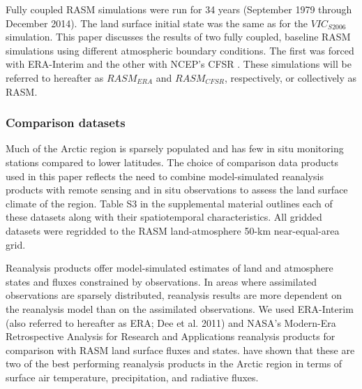 Fully coupled RASM simulations were run for 34 years (September 1979 through December 2014).
The land surface initial state was the same as for the $VIC_{S2006}$ simulation.
This paper discusses the results of two fully coupled, baseline RASM simulations using different atmospheric boundary conditions.
The first was forced with ERA-Interim \citep{Dee_2011} and the other with NCEP’s CFSR \citep{Saha_2011}.
These simulations will be referred to hereafter as $RASM_{ERA}$ and $RASM_{CFSR}$, respectively, or collectively as RASM.

\subsubsection{Comparison datasets}
\label{sec:datasets}

Much of the Arctic region is sparsely populated and has few in situ monitoring stations compared to lower latitudes.
The choice of comparison data products used in this paper reflects the need to combine model-simulated reanalysis products with remote sensing and in situ observations to assess the land surface climate of the region.
Table S3 in the supplemental material outlines each of these datasets along with their spatiotemporal characteristics.
All gridded datasets were regridded to the RASM land-atmosphere 50-km near-equal-area grid.

Reanalysis products offer model-simulated estimates of land and atmosphere states and fluxes constrained by observations.
In areas where assimilated observations are sparsely distributed, reanalysis results are more dependent on the reanalysis model than on the assimilated observations.
We used ERA-Interim (also referred to hereafter as ERA; Dee et al. 2011) and NASA’s Modern-Era Retrospective Analysis for Research and Applications \citep[MERRA; ][]{Rienecker_2011} reanalysis products for comparison with RASM land surface fluxes and states.
\citet{Lindsay_2014} have shown that these are two of the best performing reanalysis products in the Arctic region in terms of surface air temperature, precipitation, and radiative fluxes.

